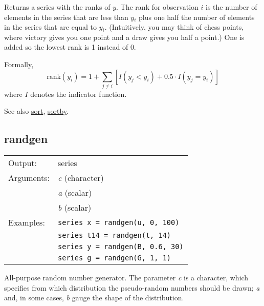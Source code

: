 	  Returns a series with the ranks of \ensuremath{y}. The rank for
	  observation \ensuremath{i} is the number of elements in the
	  series that are less than \ensuremath{y}\ensuremath{_{i}} plus one
	  half the number of elements in the series that are equal to
	  \ensuremath{y}\ensuremath{_{i}}. (Intuitively, you may think of chess
	  points, where victory gives you one point and a draw gives you
	  half a point.) One is added so the lowest rank is 1 instead of
	  0.

	  Formally, 
	  \[ \mathrm{rank}(y_i) = 1 + \sum_{j \ne i} \left[
	  I(y_j < y_i) + 0.5 \cdot I(y_j = y_i) \right] \] 
	  where $I$ denotes the indicator function.

	  See also \hyperlink{func-sort}{sort}, \hyperlink{func-sortby}{sortby}.

\subsection{randgen}
\hypertarget{func-randgen}{}

\begin{tabular}{ll}
Output:     & series\\
Arguments:  & \textsl{c} (character)\\
           & \textsl{a} (scalar)\\
           & \textsl{b} (scalar)\\
Examples:    & \texttt{series x = randgen(u, 0, 100)} \\ 
 & \texttt{series t14 = randgen(t, 14)} \\ 
 & \texttt{series y = randgen(B, 0.6, 30)} \\ 
 & \texttt{series g = randgen(G, 1, 1)}
\end{tabular}

	  All-purpose random number generator. The parameter
	  \textsl{c} is a character, which specifies from which
	  distribution the pseudo-random numbers should be drawn;
	  \textsl{a} and, in some cases, \textsl{b}
	  gauge the shape of the distribution.

